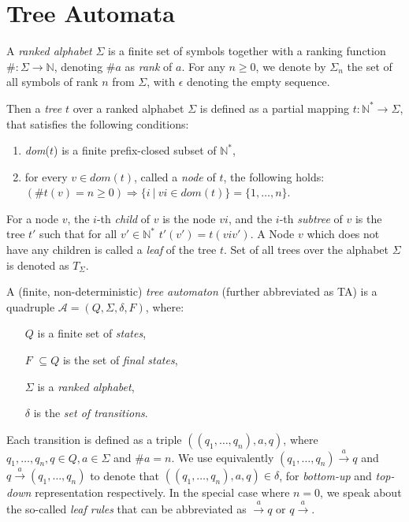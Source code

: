  \section{Tree Automata}

 A \emph{ranked alphabet} $\Sigma$ is a finite set of symbols together with a ranking function $\#: \Sigma \to \mathbb{N}$, denoting $\#a$ as \emph{rank} of $a$. For any $n \geq 0$, we denote by $\Sigma_n$ the set of all symbols of rank $n$ from $\Sigma$, with $\epsilon$ denoting the empty sequence.

Then a \emph{tree} $t$ over a ranked alphabet $\Sigma$ is defined as a partial mapping $t : \mathbb{N}^* \to \Sigma$, that satisfies the following conditions:
 \begin{enumerate}
  \item \emph{dom}($t$) is a finite prefix-closed subset of $\mathbb{N}^*$,
	\item for every $v \in dom(t)$, called a \emph{node} of $t$, the following holds: $(\#t(v) = n \geq 0) \Longrightarrow \{i\ |\ vi \in dom(t)\} = \{1,\ldots,n\}$. 
 \end{enumerate}

For a node $v$, the $i$-th \emph{child} of $v$ is the node $vi$, and the $i$-th \emph{subtree} of $v$ is the tree $t'$ such that for all $v' \in \mathbb{N}^*$ $t'(v') = t(viv')$. A Node $v$ which does not have any children is called a \emph{leaf} of the tree $t$. Set of all trees over the alphabet $\Sigma$ is denoted as $T_\Sigma$.

A (finite, non-deterministic) \emph{tree automaton} (further abbreviated as TA) is a quadruple $\mathcal{A} = (Q, \Sigma, \delta, F)$, where:
 \begin{itemize}
  \item[$Q$] is a finite set of \emph{states},
	\item[$F$] $ \subseteq Q$ is the set of \emph{final states},
	\item[$\Sigma$] is a \emph{ranked alphabet},
	\item[$\delta$] is the \emph{set of transitions}.
 \end{itemize}

Each transition is defined as a triple $((q_1,\ldots,q_n), a, q)$, where $q_1,\ldots,q_n,q \in Q, a \in \Sigma$ and $\#a = n$. We use equivalently $(q_1,\ldots,q_n) \overset{a}{\longrightarrow} q$ and $q \overset{a}{\longrightarrow}  (q_1,\ldots,q_n)$ to denote that $((q_1,\ldots,q_n), a, q) \in \delta$, for \emph{bottom-up} and \emph{top-down} representation respectively. In the special case where $n = 0$, we speak about the so-called \emph{leaf rules} that can be abbreviated as $\overset{a}{\longrightarrow}  q$ or $q \overset{a}{\longrightarrow} $.

